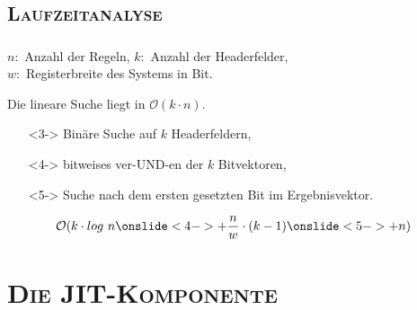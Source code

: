 \documentclass[xcolor=x11names,compress]{beamer}
\renewcommand{\(}{\begin{columns}}
\renewcommand{\)}{\end{columns}}
\newcommand{\<}[1]{\begin{column}{#1}}
\renewcommand{\>}{\end{column}}
\begin{document}

\subsection{\scshape Laufzeitanalyse}
\begin{frame}
  \frametitle{\insertsubsection}
  $n:$ Anzahl der Regeln, $k:$ Anzahl der Headerfelder,\\$w:$ Registerbreite des Systems in Bit.
  \pause
  \begin{tcolorbox}[colback=red!5!white,colframe=red!75!black,title=Erinnerung: Lineare Suche,drop fuzzy shadow]
  Die lineare Suche liegt in $\mathcal O(k \cdot n)$.
  \end{tcolorbox}
  \pause
  \begin{tcolorbox}[colback=teal!5!white,colframe=teal!75!black,title=Bitvector-Algorithmus,drop fuzzy shadow]
  \begin{itemize}[leftmargin=0cm]
    \item[]<3-> Binäre Suche auf $k$ Headerfeldern,
    \item[]<4-> bitweises ver-UND-en der $k$ Bitvektoren,
    \item[]<5-> Suche nach dem ersten gesetzten Bit im Ergebnisvektor.
  \end{itemize}
  \centering
  \begin{equation*}
  \mathcal O(k \cdot log\ n \onslide<4->{+ \frac{n}{w} \cdot (k - 1)} \onslide<5->{ + n})
  \end{equation*}
  \end{tcolorbox}
\end{frame}

\section{\scshape Die JIT-Komponente}
\begin{frame}
  \centering\Huge{\insertsection}
\end{frame}
\end{document}
